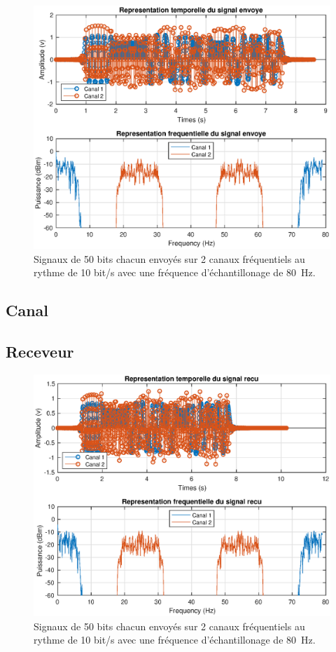 \documentclass[10pt, oneside, a4paper]{article}
\begin{document}
\begin{figure}[htbp]
	\includegraphics[width=\textwidth]{eps/sender.eps}
	\caption{Signaux de 50 bits chacun envoyés sur 2 canaux fréquentiels au rythme de 10 bit/s
			 avec une fréquence d'échantillonage de \SI{80}{\hertz}.}
	\label{fig:sender}
\end{figure}

\subsection{Canal}

\subsection{Receveur}

\begin{figure}[htbp]
	\includegraphics[width=\textwidth]{eps/receiver.eps}
	\caption{Signaux de 50 bits chacun envoyés sur 2 canaux fréquentiels au rythme de 10 bit/s
			 avec une fréquence d'échantillonage de \SI{80}{\hertz}.}
	\label{fig:receiver}
\end{figure}
\end{document}
